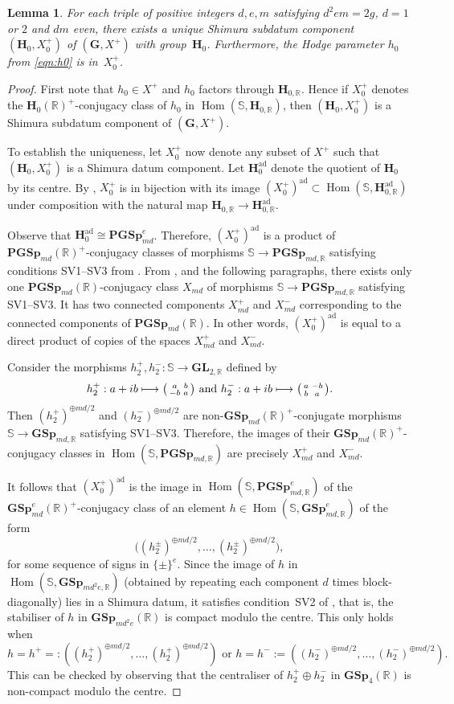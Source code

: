 \documentclass[11pt]{article}
\numberwithin{equation}{section}
\def\mto{\mathchoice{\longmapsto}{\mapsto}{\mapsto}{\mapsto}}
\newcommand{\bR}{\mathbb{R}}
\newcommand{\bS}{\mathbb{S}}
\newcommand{\gG}{\mathbf{G}}
\newcommand{\gGL}{\mathbf{GL}}
\newcommand{\gGSp}{\mathbf{GSp}}
\newcommand{\gPGSp}{\mathbf{PGSp}}
\newcommand{\gH}{\mathbf{H}}
\DeclareMathOperator{\Hom}{Hom}
\newcommand{\ad}{\mathrm{ad}}
\newcommand{\fullsmallmatrix}[4]{\bigl( \begin{smallmatrix} #1 & #2 \\ #3 & #4 \end{smallmatrix} \bigr)}
\newtheorem{lemma}{Lemma}[section]
\begin{document}
\begin{lemma}\label{unique-datum}
For each triple of positive integers $d,e,m$ satisfying $d^2em=2g$, $d=1$ or $2$ and $dm$ even, there exists a unique Shimura subdatum component $(\gH_0,X^+_0)$ of $(\gG,X^+)$ with group~$\gH_0$. Furthermore, the Hodge parameter $h_0$ from \eqref{eqn:h0} is in~$X_0^+$.
\end{lemma}

\begin{proof}
First note that $h_0 \in X^+$ and $h_0$ factors through $\gH_{0,\bR}$.
Hence if $X_0^+$ denotes the $\gH_0(\bR)^+$-conjugacy class of $h_0$ in $\Hom(\bS, \gH_{0,\bR})$, then $(\gH_0, X_0^+)$ is a Shimura subdatum component of $(\gG, X^+)$.

To establish the uniqueness, let $X_0^+$ now denote any subset of $X^+$ such that $(\gH_0, X_0^+)$ is a Shimura datum component.
Let $\gH_0^\ad$ denote the quotient of $\gH_0$ by its centre.
By \cite[Prop.\,5.7(a)]{Mil05}, $X_0^+$ is in bijection with its image $(X^+_0)^{\ad}\subset\Hom(\mathbb{S},\gH^\ad_{0,\bR})$ under composition with the natural map $\gH_{0,\bR}\to\gH^{\ad}_{0,\bR}$.

Observe that $\gH^\ad_0\cong\gPGSp_{md}^e$. Therefore, $(X^+_0)^{\ad}$ is a product of $\gPGSp_{md}(\bR)^+$-conjugacy classes of morphisms $\mathbb{S}\to\gPGSp_{md,\bR}$ satisfying conditions SV1--SV3 from \cite[\S 4]{Mil05}. From \cite[Prop 1.24]{Mil05}, and the following paragraphs, there exists only one $\gPGSp_{md}(\bR)$-conjugacy class $X_{md}$ of morphisms $\mathbb{S}\to\gPGSp_{md,\bR}$ satisfying SV1--SV3. It has two connected components $X^+_{md}$ and $X^-_{md}$ corresponding to the connected components of $\gPGSp_{md}(\bR)$. In other words, $(X^+_0)^{\ad}$ is equal to a direct product of copies of the spaces $X^+_{md}$ and $X^-_{md}$.

Consider the morphisms $h^+_2,h^-_2:\mathbb{S}\to\gGL_{2,\bR}$ defined by
\[h^+_2:a+ib\mto\fullsmallmatrix{a}{b}{-b}{a}\text{ and } h^-_2:a+ib\mto\fullsmallmatrix{a}{-b}{b}{a}.\]
Then $(h^+_2)^{\oplus md/2}$ and $(h^-_2)^{\oplus md/2}$ are non-$\gGSp_{md}(\bR)^+$-conjugate morphisms $\mathbb{S}\to\gGSp_{md,\bR}$ satisfying SV1--SV3. Therefore, the images of their $\gGSp_{md}(\bR)^+$-conjugacy classes in $\Hom(\mathbb{S},\gPGSp_{md,\bR})$ are precisely $X^+_{md}$ and $X^-_{md}$.

It follows that $(X^+_0)^{\ad}$ is the image in $\Hom(\mathbb{S},\gPGSp^e_{md,\bR})$ of the $\gGSp_{md}^e(\bR)^+$-conjugacy class of an element $h\in\Hom(\mathbb{S},\gGSp^e_{md,\bR})$ of the form
\[\bigl( (h^{\pm}_2)^{\oplus md/2}, \dotsc, (h^{\pm}_2)^{\oplus md/2} \bigr),\]
for some sequence of signs in $\{\pm\}^e$.
Since the image of $h$ in $\Hom(\mathbb{S},\gGSp_{md^2e,\bR})$ (obtained by repeating each component $d$ times block-diagonally) lies in a Shimura datum, it satisfies condition~SV2 of \cite{Mil05}, that is, the stabiliser of $h$ in $\gGSp_{md^2e}(\bR)$ is compact modulo the centre. This only holds when
\[
h=h^+=:((h^+_2)^{\oplus md/2}, \dotsc, (h^+_2)^{\oplus md/2}) \text{ or } h=h^-:=((h^-_2)^{\oplus md/2}, \dotsc, (h^-_2)^{\oplus md/2}).\]
This can be checked by observing that the centraliser of $h^+_2 \oplus h^-_2$ in $\gGSp_4(\bR)$ is non-compact modulo the centre.


\end{proof}
\end{document}
